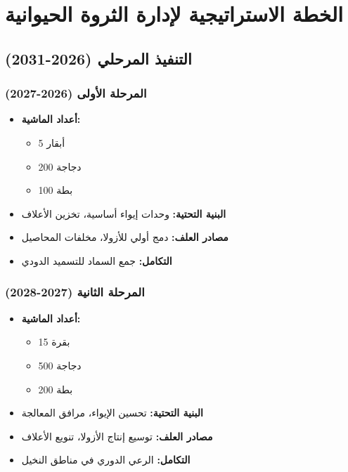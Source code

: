 \section{الخطة الاستراتيجية لإدارة الثروة الحيوانية}

\subsection{التنفيذ المرحلي (2026-2031)}

\subsubsection{المرحلة الأولى (2026-2027)}
\begin{itemize}
    \item \textbf{أعداد الماشية:}
    \begin{itemize}
        \item 5 أبقار
        \item 200 دجاجة
        \item 100 بطة
    \end{itemize}
    \item \textbf{البنية التحتية:} وحدات إيواء أساسية، تخزين الأعلاف
    \item \textbf{مصادر العلف:} دمج أولي للأزولا، مخلفات المحاصيل
    \item \textbf{التكامل:} جمع السماد للتسميد الدودي
\end{itemize}

\subsubsection{المرحلة الثانية (2027-2028)}
\begin{itemize}
    \item \textbf{أعداد الماشية:}
    \begin{itemize}
        \item 15 بقرة
        \item 500 دجاجة
        \item 200 بطة
    \end{itemize}
    \item \textbf{البنية التحتية:} تحسين الإيواء، مرافق المعالجة
    \item \textbf{مصادر العلف:} توسيع إنتاج الأزولا، تنويع الأعلاف
    \item \textbf{التكامل:} الرعي الدوري في مناطق النخيل
\end{itemize}

